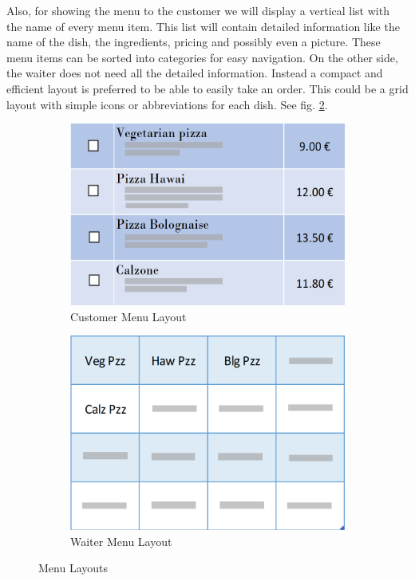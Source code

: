 \documentclass[12pt]{article}
\begin{document}
Also, for showing the menu to the customer we will display a vertical list with the name of every menu item. This list will contain detailed information like the name of the dish, the ingredients, pricing and possibly even a picture. These menu items can be sorted into categories for easy navigation. On the other side, the waiter does not need all the detailed information. Instead a compact and efficient layout is preferred to be able to easily take an order. This could be a grid layout with simple icons or abbreviations for each dish. See fig. \ref{fig:waitercustomer}.
\begin{figure}[h!]
	\begin{subfigure}{.5\textwidth}
		\includegraphics[width=0.9\linewidth]{customermenu.PNG}
		\caption{Customer Menu Layout}
		\label{fig:menucustomer}
	\end{subfigure}
	\begin{subfigure}{.5\textwidth}
		\includegraphics[width=0.9\linewidth]{waitermenu.PNG}
		\caption{Waiter Menu Layout}
		\label{fig:waitercustomer}
	\end{subfigure}
	\caption{Menu Layouts}
	\label{fig:menus}
\end{figure}
\end{document}
